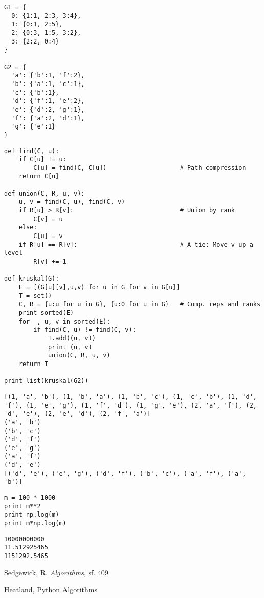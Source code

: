 \documentclass[12pt,fleqn]{article}\usepackage{../common}
\begin{document}
\begin{verbatim}
G1 = {
  0: {1:1, 2:3, 3:4},
  1: {0:1, 2:5},
  2: {0:3, 1:5, 3:2},
  3: {2:2, 0:4}
}

G2 = {
  'a': {'b':1, 'f':2},
  'b': {'a':1, 'c':1},
  'c': {'b':1},
  'd': {'f':1, 'e':2},
  'e': {'d':2, 'g':1},
  'f': {'a':2, 'd':1},
  'g': {'e':1}
}
\end{verbatim}


\begin{verbatim}
def find(C, u):
    if C[u] != u:
        C[u] = find(C, C[u])                    # Path compression
    return C[u]

def union(C, R, u, v):
    u, v = find(C, u), find(C, v)
    if R[u] > R[v]:                             # Union by rank
        C[v] = u
    else:
        C[u] = v
    if R[u] == R[v]:                            # A tie: Move v up a level
        R[v] += 1

def kruskal(G):
    E = [(G[u][v],u,v) for u in G for v in G[u]]
    T = set()
    C, R = {u:u for u in G}, {u:0 for u in G}   # Comp. reps and ranks
    print sorted(E)
    for _, u, v in sorted(E):
        if find(C, u) != find(C, v):
            T.add((u, v))
            print (u, v)
            union(C, R, u, v)
    return T

print list(kruskal(G2))
\end{verbatim}

\begin{verbatim}
[(1, 'a', 'b'), (1, 'b', 'a'), (1, 'b', 'c'), (1, 'c', 'b'), (1, 'd', 'f'), (1, 'e', 'g'), (1, 'f', 'd'), (1, 'g', 'e'), (2, 'a', 'f'), (2, 'd', 'e'), (2, 'e', 'd'), (2, 'f', 'a')]
('a', 'b')
('b', 'c')
('d', 'f')
('e', 'g')
('a', 'f')
('d', 'e')
[('d', 'e'), ('e', 'g'), ('d', 'f'), ('b', 'c'), ('a', 'f'), ('a', 'b')]
\end{verbatim}

\begin{verbatim}
m = 100 * 1000
print m**2
print np.log(m)
print m*np.log(m)
\end{verbatim}

\begin{verbatim}
10000000000
11.512925465
1151292.5465
\end{verbatim}










Sedgewick, R. {\em Algorithms}, sf. 409

Heatland, Python Algorithms
\end{document}
